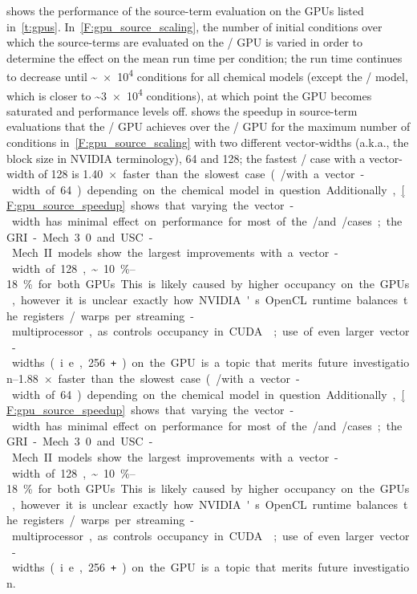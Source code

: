 \documentclass[12pt,number,sort&compress,preprint]{elsarticle}
\begin{document}
 shows the performance of the source-term evaluation on the GPUs listed in~\cref{t:gpus}.
In~\cref{F:gpu_source_scaling}, the number of initial conditions over which the source-terms are evaluated on the \gpunew/ GPU is varied in order to determine the effect on the mean run time per condition; the run time continues to decrease until \textasciitilde\num{e4} conditions for all chemical models (except the \slash{} model, which is closer to \textasciitilde\num{3e4} conditions), at which point the GPU becomes saturated and performance levels off.
 shows the speedup in source-term evaluations that the \gpunew/ GPU achieves over the \gpuold/ GPU for the maximum number of conditions in~\cref{F:gpu_source_scaling} with two different vector-widths (a.k.a., the block size in NVIDIA terminology), \num{64} and \num{128}; the fastest \gpunew/ case with a vector-width of 128 is \SIrange{1.40}{1.88}{$\times$} faster than the slowest case (\gpuold/ with a vector-width of \num{64}) depending on the chemical model in question.
Additionally,~\cref{F:gpu_source_speedup} shows that varying the vector-width has minimal effect on performance for most of the \gpunew/ and \gpuold/ cases; the GRI-Mech 3.0 and USC-Mech II models show the largest improvements with a vector-width of \num{128}, \textasciitilde\SIrange{10}{18}{\percent} for both GPUs.
This is likely caused by higher occupancy on the GPUs, however it is unclear exactly how NVIDIA's OpenCL runtime balances the registers\slash warps per streaming-multiprocessor, as controls occupancy in CUDA~\cite{occupancy}; use of even larger vector-widths (i.e., \num{256}\texttt{+}) on the GPU is a topic that merits future investigation.
\end{document}
